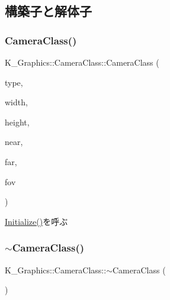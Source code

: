 \subsection{構築子と解体子}
\mbox{\label{class_k___graphics_1_1_camera_class_a2b371f16a80374ab07522af4bfe8f97c}} 
\subsubsection{\texorpdfstring{Camera\+Class()}{CameraClass()}}
{\footnotesize\ttfamily K\+\_\+\+Graphics\+::\+Camera\+Class\+::\+Camera\+Class (\begin{DoxyParamCaption}\item[{\mbox{\hyperlink{namespace_k___graphics_a46f486e742ad696f88bfbeb22f8af10f}{Camera\+Type}}}]{type,  }\item[{int}]{width,  }\item[{int}]{height,  }\item[{float}]{near,  }\item[{float}]{far,  }\item[{float}]{fov }\end{DoxyParamCaption})}



\mbox{\hyperlink{class_k___graphics_1_1_camera_class_af9efd95b7a5b0285c5bda70ca01a002a}{Initialize()}}を呼ぶ 

\mbox{\label{class_k___graphics_1_1_camera_class_a6fadd430bd4da7c246c8e2042c5693af}} 
\subsubsection{\texorpdfstring{$\sim$\+Camera\+Class()}{~CameraClass()}}
{\footnotesize\ttfamily K\+\_\+\+Graphics\+::\+Camera\+Class\+::$\sim$\+Camera\+Class (\begin{DoxyParamCaption}{ }\end{DoxyParamCaption})}



